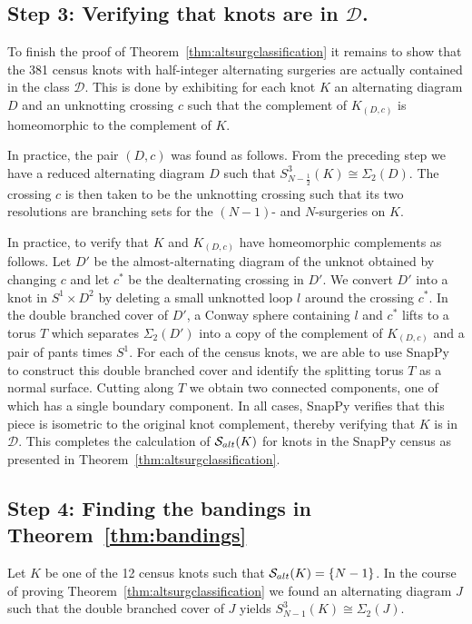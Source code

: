 \documentclass{amsart} %
\newcommand{\D}{\mathcal{D}}
\newcommand{\Salt}{\mathcal{S}_{\rm alt}}
\theoremstyle{thm}
\theoremstyle{definition}
\numberwithin{equation}{section}
\begin{document}
\subsection*{Step 3: Verifying that knots are in \texorpdfstring{$\D$}{D}.}\label{sec:tangelExteriors}
To finish the proof of Theorem~\ref{thm:altsurgclassification} it remains to show that the 381 census knots with half-integer alternating surgeries are actually contained in the class $\D$. This is done by exhibiting for each knot $K$ an alternating diagram $D$ and an unknotting crossing $c$ such that the complement of $K_{(D,c)}$ is homeomorphic to the complement of $K$.

In practice, the pair $(D,c)$ was found as follows. From the preceding step we have a reduced alternating diagram $D$ such that $S_{N-\frac{1}{2}}^3(K)\cong \Sigma_2(D)$. The crossing $c$ is then taken to be the unknotting crossing such that its two resolutions are branching sets for the $(N-1)$- and $N$-surgeries on $K$.

In practice, to verify that $K$ and $K_{(D,c)}$ have homeomorphic complements as follows. Let $D'$ be the almost-alternating diagram of the unknot obtained by changing $c$ and let $c^*$ be the dealternating crossing in $D'$.  We convert $D'$ into a knot in $S^1\times D^2$ by deleting a small unknotted loop $l$ around the crossing $c^*$. In the double branched cover of $D'$, a Conway sphere containing $l$ and $c^*$ lifts to a torus $T$ which separates $\Sigma_2(D')$ into a copy of the complement of $K_{(D,c)}$ and a pair of pants times $S^1$. For each of the census knots, we are able to use SnapPy to construct this double branched cover and identify the splitting torus $T$ as a normal surface. Cutting along $T$ we obtain two connected components, one of which has a single boundary component. In all cases, SnapPy verifies that this piece is isometric to the original knot complement, thereby verifying that $K$ is in $\D$. This completes the calculation of $\Salt(K)$ for knots in the SnapPy census as presented in Theorem~\ref{thm:altsurgclassification}.


\subsection*{Step 4: Finding the bandings in Theorem~\ref{thm:bandings}}
Let $K$ be one of the 12 census knots such that $\Salt(K)=\{N-1\}$. In the course of proving Theorem~\ref{thm:altsurgclassification} we found an alternating diagram $J$ such that the double branched cover of $J$ yields $S_{N-1}^3(K)\cong \Sigma_2(J)$.
\end{document}
